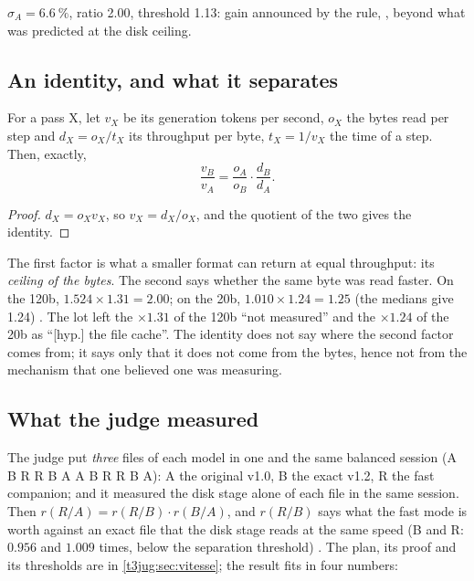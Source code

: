 $\sigma_A = \SI{6.6}{\percent}$, ratio \num{2.00}, threshold \num{1.13}: gain announced by the rule, , beyond what was predicted at the disk ceiling.

\subsection{An identity, and what it separates}\label{t3sno:sec:b3}

\begin{proposition}\label{t3sno:prop:b3}
For a pass X, let $v_X$ be its generation tokens per second, $o_X$ the bytes read per step and $d_X = o_X / t_X$ its throughput per byte, $t_X = 1/v_X$ the time of a step. Then, exactly,
\[
\frac{v_B}{v_A} = \frac{o_A}{o_B} \cdot \frac{d_B}{d_A}.
\]
\end{proposition}
\begin{proof}
$d_X = o_X v_X$, so $v_X = d_X / o_X$, and the quotient of the two gives the identity.
\end{proof}

The first factor is what a smaller format can return at equal throughput: its \emph{ceiling of the bytes}. The second says whether the same byte was read faster. On the 120b, $1.524 \times 1.31 = 2.00$; on the 20b, $1.010 \times 1.24 = 1.25$ (the medians give 1.24) \calc. The lot left the $\times 1.31$ of the 120b ``not measured'' and the $\times 1.24$ of the 20b as ``[hyp.] the file cache''. The identity does not say where the second factor comes from; it says only that it does not come from the bytes, hence not from the mechanism that one believed one was measuring.

\subsection{What the judge measured}\label{t3sno:sec:juge-vitesse}

The judge put \emph{three} files of each model in one and the same balanced session (A B R R B A A B R R B A): A the original v1.0, B the exact v1.2, R the fast companion; and it measured the disk stage alone of each file in the same session. Then $r(R/A) = r(R/B)\cdot r(B/A)$, and $r(R/B)$ says what the fast mode is worth against an exact file that the disk stage reads at the same speed (B and R: $\num{0.956}$ and $\num{1.009}$ times, below the separation threshold) \mes. The plan, its proof and its thresholds are in \cref{t3jug:sec:vitesse}; the result fits in four numbers:

